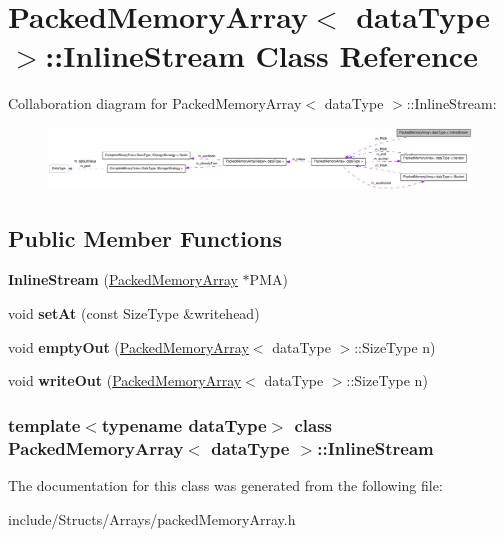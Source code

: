 \hypertarget{class_packed_memory_array_1_1_inline_stream}{
\section{PackedMemoryArray$<$ dataType $>$::InlineStream Class Reference}
\label{class_packed_memory_array_1_1_inline_stream}
}


Collaboration diagram for PackedMemoryArray$<$ dataType $>$::InlineStream:\nopagebreak
\begin{figure}[H]
\begin{center}
\leavevmode
\includegraphics[width=400pt]{class_packed_memory_array_1_1_inline_stream__coll__graph}
\end{center}
\end{figure}
\subsection*{Public Member Functions}
\begin{DoxyCompactItemize}
\item 
\hypertarget{class_packed_memory_array_1_1_inline_stream_ae07aeeea2da7c9c5e095974589103545}{
{\bfseries InlineStream} (\hyperlink{class_packed_memory_array}{PackedMemoryArray} $\ast$PMA)}
\label{class_packed_memory_array_1_1_inline_stream_ae07aeeea2da7c9c5e095974589103545}

\item 
\hypertarget{class_packed_memory_array_1_1_inline_stream_a27fc89229934641bc68d5998e217451b}{
void {\bfseries setAt} (const SizeType \&writehead)}
\label{class_packed_memory_array_1_1_inline_stream_a27fc89229934641bc68d5998e217451b}

\item 
\hypertarget{class_packed_memory_array_1_1_inline_stream_a88e211a4111d532b19221b1f6e989a94}{
void {\bfseries emptyOut} (\hyperlink{class_packed_memory_array}{PackedMemoryArray}$<$ dataType $>$::SizeType n)}
\label{class_packed_memory_array_1_1_inline_stream_a88e211a4111d532b19221b1f6e989a94}

\item 
\hypertarget{class_packed_memory_array_1_1_inline_stream_aa5417ab4edea6a778e746f44298075db}{
void {\bfseries writeOut} (\hyperlink{class_packed_memory_array}{PackedMemoryArray}$<$ dataType $>$::SizeType n)}
\label{class_packed_memory_array_1_1_inline_stream_aa5417ab4edea6a778e746f44298075db}

\end{DoxyCompactItemize}
\subsubsection*{template$<$typename dataType$>$ class PackedMemoryArray$<$ dataType $>$::InlineStream}



The documentation for this class was generated from the following file:\begin{DoxyCompactItemize}
\item 
include/Structs/Arrays/packedMemoryArray.h\end{DoxyCompactItemize}
